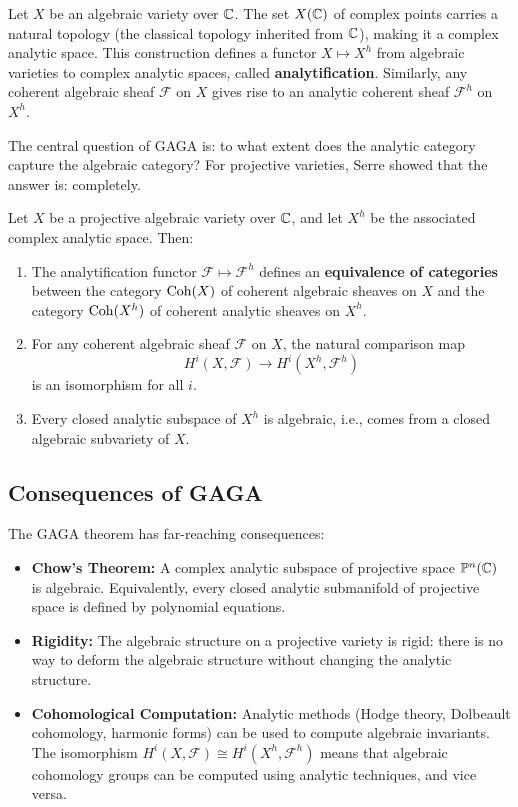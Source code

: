 Let \(X\) be an algebraic variety over \(\mathbb{C}\). The set \(X(\mathbb{C})\) of complex points carries a natural topology (the classical topology inherited from \(\mathbb{C}\)), making it a complex analytic space. This construction defines a functor \(X \mapsto X^h\) from algebraic varieties to complex analytic spaces, called \textbf{analytification}. Similarly, any coherent algebraic sheaf \(\mathcal{F}\) on \(X\) gives rise to an analytic coherent sheaf \(\mathcal{F}^h\) on \(X^h\).

The central question of GAGA is: to what extent does the analytic category capture the algebraic category? For projective varieties, Serre showed that the answer is: completely.

\begin{theorem}
Let \(X\) be a projective algebraic variety over \(\mathbb{C}\), and let \(X^h\) be the associated complex analytic space. Then:
\begin{enumerate}
    \item The analytification functor \(\mathcal{F} \mapsto \mathcal{F}^h\) defines an \textbf{equivalence of categories} between the category \(\operatorname{Coh}(X)\) of coherent algebraic sheaves on \(X\) and the category \(\operatorname{Coh}(X^h)\) of coherent analytic sheaves on \(X^h\).
    \item For any coherent algebraic sheaf \(\mathcal{F}\) on \(X\), the natural comparison map
    \[
    H^i(X, \mathcal{F}) \longrightarrow H^i(X^h, \mathcal{F}^h)
    \]
    is an isomorphism for all \(i\).
    \item Every closed analytic subspace of \(X^h\) is algebraic, i.e., comes from a closed algebraic subvariety of \(X\).
\end{enumerate}
\end{theorem}

\subsection{Consequences of GAGA}

The GAGA theorem has far-reaching consequences:

\begin{itemize}
    \item \textbf{Chow's Theorem:} A complex analytic subspace of projective space \(\mathbb{P}^n(\mathbb{C})\) is algebraic. Equivalently, every closed analytic submanifold of projective space is defined by polynomial equations.
    \item \textbf{Rigidity:} The algebraic structure on a projective variety is rigid: there is no way to deform the algebraic structure without changing the analytic structure.
    \item \textbf{Cohomological Computation:} Analytic methods (Hodge theory, Dolbeault cohomology, harmonic forms) can be used to compute algebraic invariants. The isomorphism \(H^i(X, \mathcal{F}) \cong H^i(X^h, \mathcal{F}^h)\) means that algebraic cohomology groups can be computed using analytic techniques, and vice versa.
\end{itemize}

